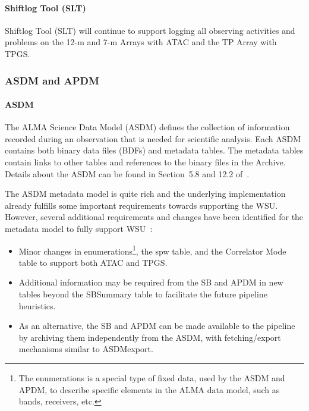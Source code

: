 \paragraph{Shiftlog Tool (SLT)}
Shiftlog Tool (SLT) will continue to support logging all observing activities and problems on the 12-m and 7-m Arrays with ATAC and the TP Array with TPGS.


\subsubsection{ASDM and APDM}\label{subsec:ASDM-APDM}
\paragraph{ASDM}
\label{ASDMchanges}
The ALMA Science Data Model (ASDM) defines the collection of information recorded during an observation that is needed for scientific analysis. Each ASDM contains both binary data files (BDFs) and metadata tables. The metadata tables contain links to other tables and references to the binary files in the Archive. Details about the ASDM can be found in Section~5.8 and 12.2 of~\cite{c10_thb}. 

The ASDM metadata model is quite rich and the underlying implementation already fulfills some important requirements towards supporting the WSU.
However, several additional requirements and changes have been identified for the metadata model to fully support WSU~\cite{dm}:
\begin{itemize}[itemsep=-0.5em]
\item Minor changes in enumerations\footnote{The enumerations is a special type of fixed data, used by the ASDM and APDM, to describe specific elements in the ALMA data model, such as bands, receivers, etc.}, the spw table, and the Correlator Mode table to support both ATAC and TPGS.
\item Additional information may be required from the SB and APDM in new tables beyond the SBSummary table to facilitate the future pipeline heuristics.
\item As an alternative, the SB and APDM can be made available to the pipeline by archiving them independently from the ASDM, with fetching/export mechanisms similar to ASDM\-export.
\end{itemize}

